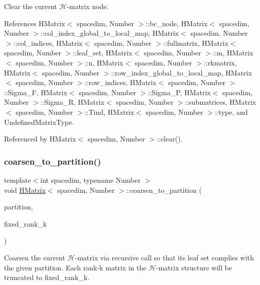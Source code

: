 Clear the current $\mathcal{H}$-\/matrix node. 

References H\+Matrix$<$ spacedim, Number $>$\+::bc\+\_\+node, H\+Matrix$<$ spacedim, Number $>$\+::col\+\_\+index\+\_\+global\+\_\+to\+\_\+local\+\_\+map, H\+Matrix$<$ spacedim, Number $>$\+::col\+\_\+indices, H\+Matrix$<$ spacedim, Number $>$\+::fullmatrix, H\+Matrix$<$ spacedim, Number $>$\+::leaf\+\_\+set, H\+Matrix$<$ spacedim, Number $>$\+::m, H\+Matrix$<$ spacedim, Number $>$\+::n, H\+Matrix$<$ spacedim, Number $>$\+::rkmatrix, H\+Matrix$<$ spacedim, Number $>$\+::row\+\_\+index\+\_\+global\+\_\+to\+\_\+local\+\_\+map, H\+Matrix$<$ spacedim, Number $>$\+::row\+\_\+indices, H\+Matrix$<$ spacedim, Number $>$\+::\+Sigma\+\_\+F, H\+Matrix$<$ spacedim, Number $>$\+::\+Sigma\+\_\+P, H\+Matrix$<$ spacedim, Number $>$\+::\+Sigma\+\_\+R, H\+Matrix$<$ spacedim, Number $>$\+::submatrices, H\+Matrix$<$ spacedim, Number $>$\+::\+Tind, H\+Matrix$<$ spacedim, Number $>$\+::type, and Undefined\+Matrix\+Type.



Referenced by H\+Matrix$<$ spacedim, Number $>$\+::clear().

\mbox{\label{classHMatrix_a525ad4d453f4f496b98cccb341c8b60b}} 
\subsubsection{\texorpdfstring{coarsen\+\_\+to\+\_\+partition()}{coarsen\_to\_partition()}}
{\footnotesize\ttfamily template$<$int spacedim, typename Number $>$ \\
void \hyperlink{classHMatrix}{H\+Matrix}$<$ spacedim, Number $>$\+::coarsen\+\_\+to\+\_\+partition (\begin{DoxyParamCaption}\item[{const std\+::vector$<$ typename \hyperlink{classBlockClusterTree}{Block\+Cluster\+Tree}$<$ spacedim, Number $>$\+::node\+\_\+pointer\+\_\+type $>$ \&}]{partition,  }\item[{const unsigned int}]{fixed\+\_\+rank\+\_\+k }\end{DoxyParamCaption})}

Coarsen the current $\mathcal{H}$-\/matrix via recursive call so that its leaf set complies with the given partition. Each rank-\/k matrix in the $\mathcal{H}$-\/matrix structure will be truncated to {\ttfamily fixed\+\_\+rank\+\_\+k}.

